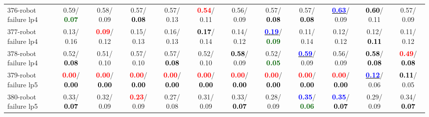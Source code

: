 \begin{table}[h]
\begin{center}
{\begin{tabular}{lc|c|c|c|c|c|c|c|c|c|c}
376-robot failure lp4 &   0.59/\textcolor{darkgreen}{\textbf{  0.07}} &   0.58/  0.09 &   0.57/\textcolor{black}{\textbf{  0.08}} &   0.57/  0.13 & \textcolor{red}{\textbf{  0.54}}/  0.11 &   0.56/  0.09 &   0.57/\textcolor{black}{\textbf{  0.08}} &   0.57/\textcolor{black}{\textbf{  0.08}} & \underline{\textcolor{blue}{\textbf{  0.63}}}/  0.09 & \textcolor{black}{\textbf{  0.60}}/  0.11 &   0.57/  0.09 \\
377-robot failure lp4 &   0.13/  0.16 & \textcolor{red}{\textbf{  0.09}}/  0.12 &   0.15/  0.13 &   0.16/  0.13 & \textcolor{black}{\textbf{  0.17}}/  0.14 &   0.14/  0.12 & \underline{\textcolor{blue}{\textbf{  0.19}}}/\textcolor{darkgreen}{\textbf{  0.09}} &   0.11/  0.14 &   0.12/  0.12 &   0.12/\textcolor{black}{\textbf{  0.11}} &   0.11/  0.12 \\
378-robot failure lp4 &   0.52/\textcolor{black}{\textbf{  0.08}} &   0.51/  0.10 &   0.57/  0.10 &   0.57/\textcolor{black}{\textbf{  0.08}} &   0.52/  0.10 & \textcolor{black}{\textbf{  0.58}}/  0.09 &   0.52/\textcolor{darkgreen}{\textbf{  0.05}} & \underline{\textcolor{blue}{\textbf{  0.59}}}/  0.09 &   0.56/  0.09 & \textcolor{black}{\textbf{  0.58}}/\textcolor{black}{\textbf{  0.08}} & \textcolor{red}{\textbf{  0.49}}/\textcolor{black}{\textbf{  0.08}} \\
379-robot failure lp5 & \textcolor{red}{\textbf{  0.00}}/\textcolor{black}{\textbf{  0.00}} & \textcolor{red}{\textbf{  0.00}}/\textcolor{black}{\textbf{  0.00}} & \textcolor{red}{\textbf{  0.00}}/\textcolor{black}{\textbf{  0.00}} & \textcolor{red}{\textbf{  0.00}}/\textcolor{black}{\textbf{  0.00}} & \textcolor{red}{\textbf{  0.00}}/\textcolor{black}{\textbf{  0.00}} & \textcolor{red}{\textbf{  0.00}}/\textcolor{black}{\textbf{  0.00}} & \textcolor{red}{\textbf{  0.00}}/\textcolor{black}{\textbf{  0.00}} & \textcolor{red}{\textbf{  0.00}}/\textcolor{black}{\textbf{  0.00}} & \textcolor{red}{\textbf{  0.00}}/\textcolor{black}{\textbf{  0.00}} & \underline{\textcolor{blue}{\textbf{  0.12}}}/  0.06 & \textcolor{black}{\textbf{  0.11}}/  0.05 \\
380-robot failure lp5 &   0.33/\textcolor{black}{\textbf{  0.07}} &   0.32/  0.09 & \textcolor{red}{\textbf{  0.23}}/  0.09 &   0.27/  0.08 &   0.31/  0.09 &   0.33/\textcolor{black}{\textbf{  0.07}} &   0.28/  0.09 & \textcolor{blue}{\textbf{  0.35}}/\textcolor{darkgreen}{\textbf{  0.06}} & \textcolor{blue}{\textbf{  0.35}}/\textcolor{black}{\textbf{  0.07}} &   0.29/  0.09 &   0.34/\textcolor{black}{\textbf{  0.07}} \\ \hline

\end{tabular}}
\end{center}
\end{table}
